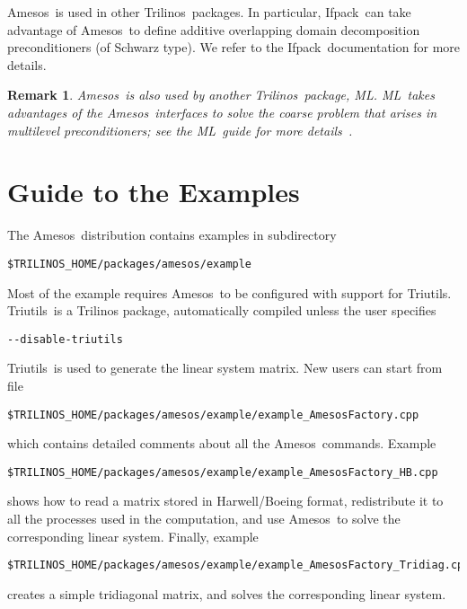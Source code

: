 \documentclass[11pt]{SANDreport}
\newcommand{\amesos}{{\sc Amesos}}
\newcommand{\ml}{{\sc ML}}
\newcommand{\ifpack}{{\sc Ifpack}}
\newcommand{\triutils}{{\sc Triutils}}
\newcommand{\trilinos}{{\sc Trilinos}}
\newtheorem{remark}{Remark}
\begin{document}
\amesos\ is used in other \trilinos\ packages. In particular, \ifpack\
  can take advantage of \amesos\ to define additive overlapping domain
  decomposition preconditioners (of Schwarz type). We refer to the
  \ifpack\ documentation for more details.

\begin{remark}
\amesos\ is also used by another \trilinos\ package, \ml. \ml\ takes
advantages of the \amesos\ interfaces to solve the coarse problem
that arises in multilevel preconditioners; see the \ml\ guide for more
details~\cite{ml-guide}.
\end{remark}

\section{Guide to the Examples}
\label{sec:examples}

The \amesos\ distribution contains examples in subdirectory
\begin{verbatim}
$TRILINOS_HOME/packages/amesos/example
\end{verbatim}
Most of the example requires \amesos\ to be configured with support for
\triutils. \triutils\ is a Trilinos package, automatically compiled unless
the user specifies
\begin{verbatim}
--disable-triutils
\end{verbatim}
\triutils\ is used to generate the linear system matrix. New users can
start from file
\begin{verbatim}
$TRILINOS_HOME/packages/amesos/example/example_AmesosFactory.cpp
\end{verbatim}
which contains detailed comments about all the \amesos\ commands.
Example
\begin{verbatim}
$TRILINOS_HOME/packages/amesos/example/example_AmesosFactory_HB.cpp
\end{verbatim}
shows how to read a matrix stored in Harwell/Boeing format, redistribute it
to all the processes used in the computation, and use \amesos\ to solve the
corresponding linear system. Finally, example
\begin{verbatim}
$TRILINOS_HOME/packages/amesos/example/example_AmesosFactory_Tridiag.cpp
\end{verbatim}
creates a simple tridiagonal matrix, and solves the corresponding linear
system.



\end{document}
